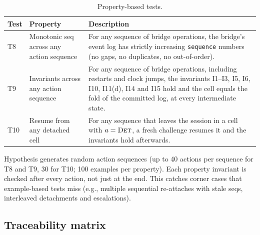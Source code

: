 \begin{longtable}{p{} p{} p{}}
\caption{Property-based tests.}\label{tab:property-tests}\\
\toprule
\textbf{Test} & \textbf{Property} & \textbf{Description} \\
\midrule
T8 & Monotonic seq across any action sequence & For any sequence of
bridge operations, the bridge's event log has strictly increasing
\texttt{sequence} numbers (no gaps, no duplicates, no out-of-order). \\
T9 & Invariants across any action sequence & For any sequence
of bridge operations, including restarts and clock jumps, the invariants
I1--I3, I5, I6, I10, I11(d), I14 and I15 hold and the cell equals the fold of the committed
log, at every intermediate state. \\
T10 & Resume from any detached cell & For any sequence that leaves the
session in a cell with $a=\textsc{Det}$, a fresh challenge resumes it and
the invariants hold afterwards. \\
\bottomrule
\end{longtable}

Hypothesis generates random action sequences (up to 40 actions per
sequence for T8 and T9, 30 for T10; 100 examples per property). Each property invariant is checked
after every action, not just at the end. This catches corner cases
that example-based tests miss (e.g., multiple sequential re-attaches
with stale seqs, interleaved detachments and escalations).

\subsection{Traceability matrix}
\label{app:traceability}

